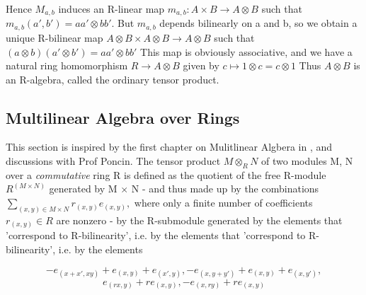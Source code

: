 \documentclass[preprint, 5p, 10pt]{elsarticle}
\theoremstyle{plain}
\begin{document}
Hence $M_{a,b}$ induces an R-linear map $m_{a,b}:A \times B \rightarrow A \otimes B$ such that
$m_{a,b}(a',b')= aa' \otimes bb'$. But $m_{a,b}$ depends bilinearly on a and b, so we obtain a unique 
R-bilinear map
$A \otimes B \times A \otimes B \rightarrow A \otimes B$ 
such that $(a \otimes b)(a' \otimes b') = aa' \otimes bb'$
This map is obviously associative, and we have a natural ring homomorphism 
$R \rightarrow A \otimes B$ given by $c \mapsto 1 \otimes c = c \otimes 1$
Thus $A \otimes B$ is an R-algebra, called the ordinary tensor product. 
\subsection{Multilinear Algebra over Rings} 
 This section is inspired by the first chapter on Mulitlinear Algbera in \cite{QuantumFieldsandStrings},
and discussions with Prof Poncin.
The tensor product $M\otimes_{R}N$ of two modules M, N over a \emph{commutative} ring R is defined 
as the
quotient of the free R-module $R^{(M \times N)}$ generated by M $\times$ N - and thus made up by 
the combinations 
$
 \sum_{(x,y)\in M \times N} r_{(x,y)}e_{(x,y)},
$
where only a finite number of coefficients $r_{(x,y)}\in R$ are nonzero - by the R-submodule generated
by the elements that 'correspond to R-bilinearity', i.e. by the elements that 
'correspond to R-bilinearity',
i.e. by the elements


\begin{displaymath}
 -e_{(x+x',xy)} + e_{(x,y)} + e_{(x',y)}, -e_{(x,y+y')}+e_{(x,y)}+e_{(x,y')},\end{displaymath}
    \begin{displaymath}
    e_{(rx,y)} + re_{(x,y)}, -e_{(x,ry)}+re_{(x,y)}
    \end{displaymath}
                                                                         
\end{document}
